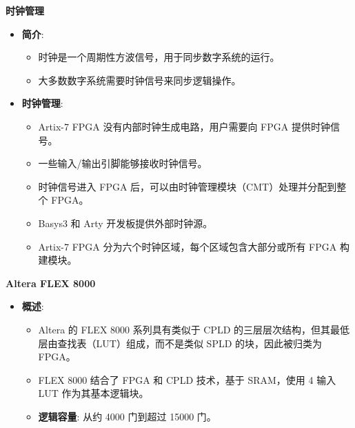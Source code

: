 \documentclass[
  ignorenonframetext,
  chinese,
]{beamer}
\providecommand{\tightlist}{%
  \setlength{\itemsep}{0pt}\setlength{\parskip}{0pt}}
\begin{document}
\begin{frame}
\begin{block}{\textbf{时钟管理}}
\label{ux65f6ux949fux7ba1ux7406}
\begin{itemize}
\tightlist
\item
  \textbf{简介}:

  \begin{itemize}
  \tightlist
  \item
    时钟是一个周期性方波信号，用于同步数字系统的运行。
  \item
    大多数数字系统需要时钟信号来同步逻辑操作。
  \end{itemize}
\item
  \textbf{时钟管理}:

  \begin{itemize}
  \tightlist
  \item
    Artix-7 FPGA 没有内部时钟生成电路，用户需要向 FPGA 提供时钟信号。
  \item
    一些输入/输出引脚能够接收时钟信号。
  \item
    时钟信号进入 FPGA 后，可以由时钟管理模块（CMT）处理并分配到整个
    FPGA。
  \item
    Basys3 和 Arty 开发板提供外部时钟源。
  \item
    Artix-7 FPGA 分为六个时钟区域，每个区域包含大部分或所有 FPGA
    构建模块。
  \end{itemize}
\end{itemize}
\end{block}
\end{frame}

\begin{frame}
\begin{block}{\textbf{Altera FLEX 8000}}
\label{altera-flex-8000}
\begin{itemize}
\tightlist
\item
  \textbf{概述}:

  \begin{itemize}
  \tightlist
  \item
    Altera 的 FLEX 8000 系列具有类似于 CPLD
    的三层层次结构，但其最低层由查找表（LUT）组成，而不是类似 SPLD
    的块，因此被归类为 FPGA。
  \item
    FLEX 8000 结合了 FPGA 和 CPLD 技术，基于 SRAM，使用 4 输入 LUT
    作为其基本逻辑块。
  \item
    \textbf{逻辑容量}: 从约 4000 门到超过 15000 门。
  \end{itemize}
\end{itemize}
\end{block}
\end{frame}
\end{document}
